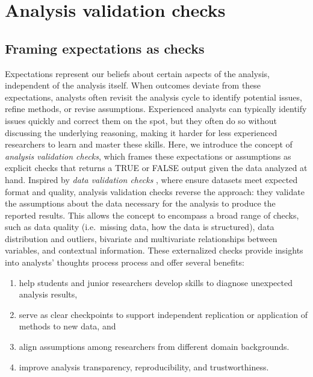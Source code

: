 \documentclass[
  12pt,
]{interact}
\providecommand{\tightlist}{%
  \setlength{\itemsep}{0pt}\setlength{\parskip}{0pt}}\usepackage{longtable,booktabs,array}
\begin{document}
\section{Analysis validation checks}\label{sec-plan}

\subsection{Framing expectations as
checks}\label{framing-expectations-as-checks}

Expectations represent our beliefs about certain aspects of the
analysis, independent of the analysis itself. When outcomes deviate from
these expectations, analysts often revisit the analysis cycle to
identify potential issues, refine methods, or revise assumptions.
Experienced analysts can typically identify issues quickly and correct
them on the spot, but they often do so without discussing the underlying
reasoning, making it harder for less experienced researchers to learn
and master these skills. Here, we introduce the concept of
\emph{analysis validation checks}, which frames these expectations or
assumptions as explicit checks that returns a TRUE or FALSE output given
the data analyzed at hand. Inspired by \emph{data validation checks}
\citep{validate}, where ensure datasets meet expected format and
quality, analysis validation checks reverse the approach: they validate
the assumptions about the data necessary for the analysis to produce the
reported results. This allows the concept to encompass a broad range of
checks, such as data quality (i.e.~missing data, how the data is
structured), data distribution and outliers, bivariate and multivariate
relationships between variables, and contextual information. These
externalized checks provide insights into analysts' thoughts process
process and offer several benefits:

\begin{enumerate}
\def\labelenumi{\arabic{enumi})}
\tightlist
\item
  help students and junior researchers develop skills to diagnose
  unexpected analysis results,
\item
  serve as clear checkpoints to support independent replication or
  application of methods to new data, and
\item
  align assumptions among researchers from different domain backgrounds.
\item
  improve analysis transparency, reproducibility, and trustworthiness.
\end{enumerate}
\end{document}
